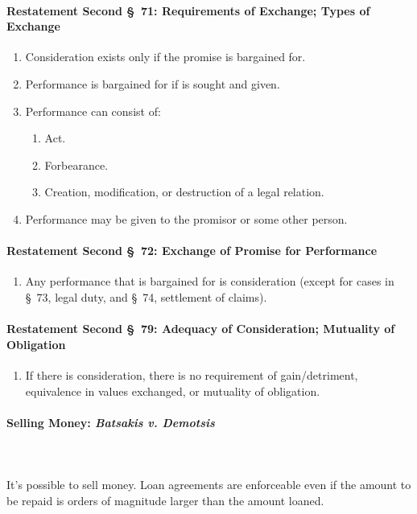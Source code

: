 \paragraph{Restatement Second \S\ 71: Requirements of Exchange; Types of 
Exchange}

\begin{enumerate}
    \item Consideration exists only if the promise is bargained for.
    \item Performance is bargained for if is sought and given.
    \item Performance can consist of:
    \begin{enumerate}
        \item Act.
        \item Forbearance.
        \item Creation, modification, or destruction of a legal relation.
    \end{enumerate}
    \item Performance may be given to the promisor or some other person.
\end{enumerate}

\paragraph{Restatement Second \S\ 72: Exchange of Promise for Performance}

\begin{enumerate}
    \item Any performance that is bargained for is consideration (except for 
    cases in \S\ 73, legal duty, and \S\ 74, settlement of claims).
\end{enumerate}

\paragraph{Restatement Second \S\ 79: Adequacy of Consideration; Mutuality of 
Obligation}

\begin{enumerate}
    \item If there is consideration, there is no requirement of 
    gain/detriment, equivalence in values exchanged, or mutuality of 
    obligation.
\end{enumerate}

\paragraph{Selling Money: \emph{Batsakis v. Demotsis}}
~\\\\
It's possible to sell money. Loan agreements are enforceable even if the 
amount to be repaid is orders of magnitude larger than the amount loaned.

